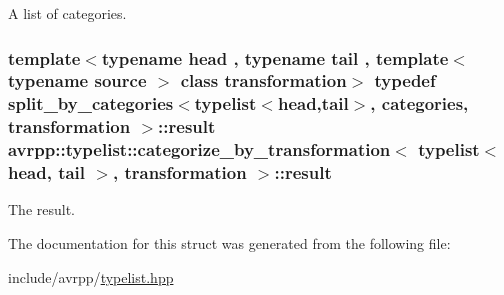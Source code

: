 A list of categories. 

\hypertarget{structavrpp_1_1typelist_1_1categorize__by__transformation_3_01typelist_3_01head_00_01tail_01_4_00_01transformation_01_4_a69149872a2c58b86b6a27c470a6e42fa}{
\subsubsection[{result}]{\setlength{\rightskip}{0pt plus 5cm}template$<$typename head , typename tail , template$<$ typename source $>$ class transformation$>$ typedef split\_\-by\_\-categories$<${\bf typelist}$<$head,tail$>$, {\bf categories}, transformation $>$::{\bf result} avrpp::typelist::categorize\_\-by\_\-transformation$<$ {\bf typelist}$<$ head, tail $>$, transformation $>$::{\bf result}}}
\label{structavrpp_1_1typelist_1_1categorize__by__transformation_3_01typelist_3_01head_00_01tail_01_4_00_01transformation_01_4_a69149872a2c58b86b6a27c470a6e42fa}


The result. 



The documentation for this struct was generated from the following file:\begin{DoxyCompactItemize}
\item 
include/avrpp/\hyperlink{typelist_8hpp}{typelist.hpp}\end{DoxyCompactItemize}
